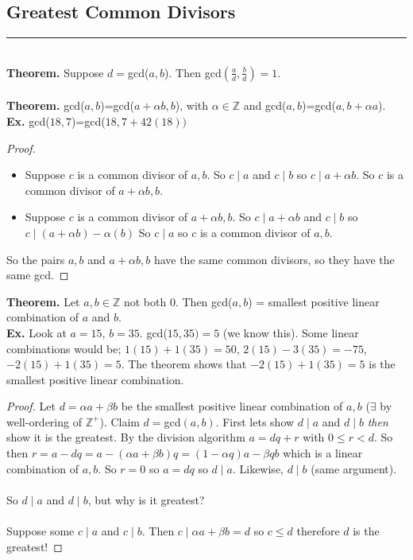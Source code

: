 \documentclass[class=article, crop=false]{standalone}
\def\integers{{\mathbb Z}}
\begin{document}
\subsection{Greatest Common Divisors}
\rule{\textwidth}{1pt}\\
\textbf{Theorem.} Suppose $d=$gcd($a,b$). Then gcd$\left(\frac{a}{d}, \frac{b}{d}\right)=1$.\\\\
\textbf{Theorem.} gcd($a,b$)=gcd($a+\alpha b,b$), with $\alpha\in\integers$ and gcd($a,b$)=gcd($a, b+\alpha a$).\\
\textbf{Ex.} gcd($18,7$)=gcd($18, 7+42(18))$
\begin{proof}
	$ $
	\begin{itemize}
		\item Suppose $c$ is a common divisor of $a,b$. So $c\mid a$ and $c\mid b$ so $c\mid a+\alpha b$.
		So $c$ is a common divisor of $a+\alpha b, b$.
		\item Suppose $c$ is a common divisor of $a+\alpha b, b$. So $c\mid a+\alpha b$ and $c\mid b$ so $c\mid (a+\alpha b)- \alpha(b)$
		So $c\mid a$ so $c$ is a common divisor of $a,b$. 
	\end{itemize}
	So the pairs $a,b$ and $a+\alpha b, b$ have the same common divisors,
	so they have the same gcd.
\end{proof}
\noindent\textbf{Theorem.} Let $a,b\in\integers$ not both $0$. Then gcd($a,b$) = smallest positive linear combination
of $a$ and $b$.\\
\textbf{Ex.} Look at $a=15$, $b=35$. gcd($15,35)=5$ (we know this). Some linear combinations would be; $1(15)+1(35)=50$,
$2(15)-3(35)=-75$, $-2(15)+1(35)=5$. The theorem shows that $-2(15)+1(35)=5$ is the smallest positive linear combination.
\begin{proof}
	Let $d=\alpha a+\beta b$ be the smallest positive linear combination of $a,b$ ($\exists$ by well-ordering of $\integers^+$).
	Claim $d=$gcd$(a,b)$.
	First lets show $d\mid a$ and $d\mid b$ \emph{then} show it is the greatest.
	By the division algorithm $a=dq+r$ with $0\leq r<d$. So then $r=a-dq=a-(\alpha a+\beta b)q=(1-\alpha q)a-\beta qb$
	which is a linear combination of $a,b$. So $r=0$ so $a=dq$ so $d\mid a$. Likewise, $d\mid b$ (same argument).\\\\
	So $d\mid a$ and $d\mid b$, but why is it greatest?\\\\
	Suppose some $c\mid a$ and $c\mid b$. Then $c\mid \alpha a + \beta b=d$ so $c\leq d$ therefore $d$ is the greatest!
\end{proof}
\end{document}
